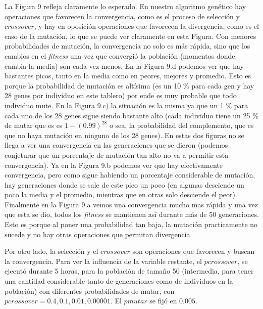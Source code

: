 \documentclass[A4paper,oneside,fleqn,11pt]{article}
\theoremstyle{definition}
\begin{document}
La Figura 9 refleja claramente lo esperado. En nuestro algoritmo genético hay operaciones que favorecen la convergencia, como es el proceso de selección y $crossover$, y hay en oposición operaciones que favorecen la divergencia, como es el caso de la mutación, lo que se puede ver claramente en esta Figura. Con menores probabilidades de mutación, la convergencia no solo es más rápida, sino que los cambios en el \textit{fitness} una vez que convergió la población (momentos donde cambia la media) son cada vez menos. En la Figura 9.d podemos ver que hay bastantes picos, tanto en la media como en peores, mejores y promedio. Esto es porque la probabilidad de mutación es altísima (es un 10 \% para cada gen y hay 28 genes por individuo en este tablero) por ende es muy probable que todo individuo mute. En la Figura 9.c) la situación es la misma ya que un 1 \% para cada uno de los 28 genes sigue siendo bastante alto (cada individuo tiene un 25 \% de mutar que es es $1- (0.99)^{28}$ o sea, la probabilidad del complemento, que es que no haya mutación en ninguno de los 28 genes). En estas dos figuras no se llega a ver una convergencia en las generaciones que se dieron (podemos conjeturar que un porcentaje de mutación tan alto no va a permitir esta convergencia). Ya en la Figura 9.b podemos ver que hay efectivamente convergencia, pero como sigue habiendo un porcentaje considerable de mutación, hay generaciones donde se sale de este pico un poco (en algunas desciende un poco la media y el promedio, mientras que en otras solo desciende el peor). Finalmente en la Figura 9.a vemos una convergencia mucho mas rápida y una vez que esta se dio, todos los \textit{fitness} se mantienen así durante más de 50 generaciones. Esto es porque al poner una probabilidad tan baja, la mutación practicamente no sucede y no hay otras operaciones que permitan divergencia.

Por otro lado, la selección y el $crossover$ son operaciones que favorecen y buscan la convergencia. Para ver la influencia de la variable restante, el $pcrossover$, se ejecutó durante 5 horas, para la población de tamaño 50 (intermedia, para tener una cantidad considerable tanto de generaciones como de individuos en la población) con diferentes probabilidades de mutar, con $pcrossover= 0.4, 0.1, 0.01, 0.00001$.  El $pmutar$ se fijó en $0.005$.
\end{document}
